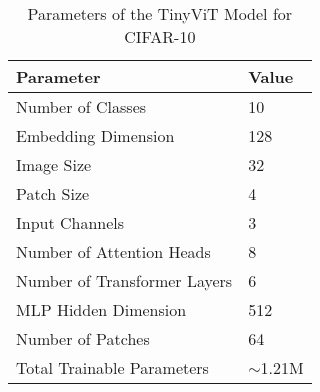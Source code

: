 \begin{table}[ht]
  \centering
  \caption{Parameters of the TinyViT Model for CIFAR-10}
  \label{tab:tinyvit_params}
  \begin{tabular}{@{}ll@{}}
    \toprule
    \textbf{Parameter} & \textbf{Value} \\
    \midrule
    Number of Classes & 10 \\
    Embedding Dimension & 128 \\
    Image Size & 32 \\
    Patch Size & 4 \\
    Input Channels & 3 \\
    Number of Attention Heads & 8 \\
    Number of Transformer Layers & 6 \\
    MLP Hidden Dimension & 512 \\
    Number of Patches & 64 \\
    Total Trainable Parameters & $\sim$1.21M \\
    \bottomrule
  \end{tabular}
\end{table}